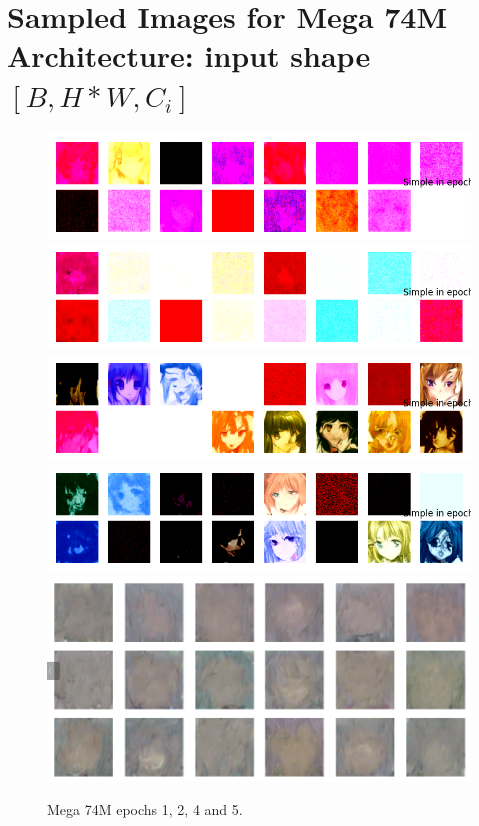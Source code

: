 \documentclass[twocolumn,superscriptaddress,aps]{revtex4-1}
\begin{document}
\section{Sampled Images for Mega 74M Architecture: input shape $[B, H*W, C_i]$}
\begin{figure}[H]
    \centering
    \includegraphics[width=.32\textwidth]{figures/mega_unet_ddpm_74M_ckpt_epoch_1_epoch_1_samples.png}
    \includegraphics[width=.32\textwidth]{figures/mega_unet_ddpm_74M_ckpt_epoch_2_epoch_2_samples.png}
    \includegraphics[width=.32\textwidth]{figures/mega_unet_ddpm_74M_ckpt_epoch_4_epoch_4_samples.png}
    \includegraphics[width=.32\textwidth]{figures/mega_unet_ddpm_74M_ckpt_epoch_5_epoch_5_samples.png}
    \includegraphics[width=.32\textwidth]{figures/74M-badattention-epoch16.png}
    \caption{Mega 74M epochs 1, 2, 4 and 5.}
    \label{fig:mega_74m_samples}
\end{figure}
\end{document}
